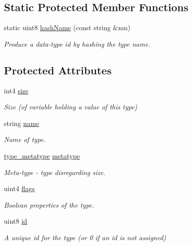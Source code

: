 \subsection*{Static Protected Member Functions}
\begin{DoxyCompactItemize}
\item 
static uint8 \mbox{\hyperlink{class_datatype_a4733a0e51a359ad324583d06824b5b92}{hash\+Name}} (const string \&nm)
\begin{DoxyCompactList}\small\item\em Produce a data-\/type id by hashing the type name. \end{DoxyCompactList}\end{DoxyCompactItemize}
\subsection*{Protected Attributes}
\begin{DoxyCompactItemize}
\item 
int4 \mbox{\hyperlink{class_datatype_a14476d90cd8993852b349b621876b292}{size}}
\begin{DoxyCompactList}\small\item\em Size (of variable holding a value of this type) \end{DoxyCompactList}\item 
string \mbox{\hyperlink{class_datatype_a66d6613a73e69cd4665c90441c4613b3}{name}}
\begin{DoxyCompactList}\small\item\em Name of type. \end{DoxyCompactList}\item 
\mbox{\hyperlink{type_8hh_aef6429f2523cdf4d415ba04a0209e61f}{type\+\_\+metatype}} \mbox{\hyperlink{class_datatype_a79a16cdae5aff36880bee9122889a0b9}{metatype}}
\begin{DoxyCompactList}\small\item\em Meta-\/type -\/ type disregarding size. \end{DoxyCompactList}\item 
uint4 \mbox{\hyperlink{class_datatype_a82e59a9379488b5afdae69817c0955fb}{flags}}
\begin{DoxyCompactList}\small\item\em Boolean properties of the type. \end{DoxyCompactList}\item 
uint8 \mbox{\hyperlink{class_datatype_ac2bb702c6067fae98d7c0257e928d5a1}{id}}
\begin{DoxyCompactList}\small\item\em A unique id for the type (or 0 if an id is not assigned) \end{DoxyCompactList}\end{DoxyCompactItemize}
